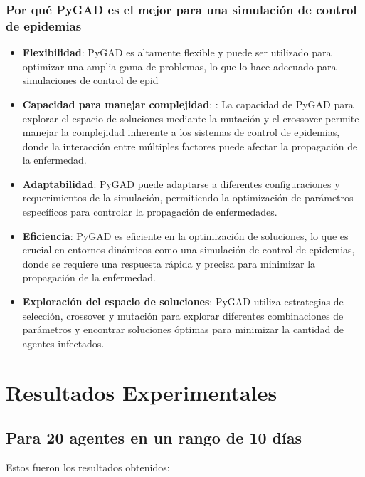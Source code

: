 \subsubsection{Por qué PyGAD es el mejor para una simulación de control de epidemias}
\begin{itemize}
    \item \textbf{Flexibilidad}: PyGAD es altamente flexible y puede ser utilizado para optimizar una amplia gama de problemas, lo que lo hace adecuado para simulaciones de control de epid
    \item \textbf{Capacidad para manejar complejidad}: : La capacidad de PyGAD para explorar el espacio de soluciones mediante la mutación y el crossover permite manejar la complejidad inherente a los sistemas de control de epidemias, donde la interacción entre múltiples factores puede afectar la propagación de la enfermedad.
    \item \textbf{Adaptabilidad}: PyGAD puede adaptarse a diferentes configuraciones y requerimientos de la simulación, permitiendo la optimización de parámetros específicos para controlar la propagación de enfermedades. 
    \item \textbf{Eficiencia}: PyGAD es eficiente en la optimización de soluciones, lo que es crucial en entornos dinámicos como una simulación de control de epidemias, donde se requiere una respuesta rápida y precisa para minimizar la propagación de la enfermedad. 
    \item \textbf{Exploración del espacio de soluciones}: PyGAD utiliza estrategias de selección, crossover y mutación para explorar diferentes combinaciones de parámetros y encontrar soluciones óptimas para minimizar la cantidad de agentes infectados. 
    \end{itemize} 
     
    \section{Resultados Experimentales}
    \subsection{Para 20 agentes en un rango de 10 días}
    Estos fueron los resultados obtenidos:
    
